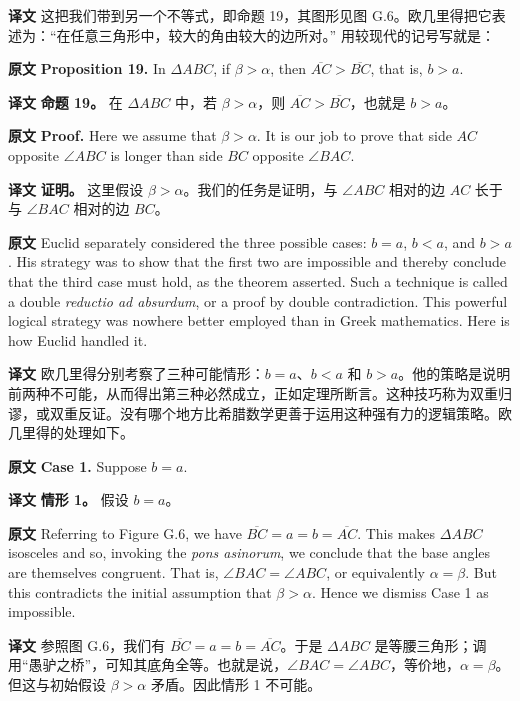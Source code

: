 \documentclass[UTF8,zihao=-4]{ctexart}
\begin{document}
\noindent\textbf{译文} 这把我们带到另一个不等式，即命题 19，其图形见图 G.6。欧几里得把它表述为：``在任意三角形中，较大的角由较大的边所对。'' 用较现代的记号写就是：

\noindent\textbf{原文} \textbf{Proposition 19.} In $\Delta ABC$, if $\beta>\alpha$, then $\overline{AC}>\overline{BC}$, that is, $b>a$.

\noindent\textbf{译文} \textbf{命题 19。} 在 $\Delta ABC$ 中，若 $\beta>\alpha$，则 $\overline{AC}>\overline{BC}$，也就是 $b>a$。

\noindent\textbf{原文} \textbf{Proof.} Here we assume that $\beta>\alpha$. It is our job to prove that side $AC$ opposite $\angle ABC$ is longer than side $BC$ opposite $\angle BAC$.

\noindent\textbf{译文} \textbf{证明。} 这里假设 $\beta>\alpha$。我们的任务是证明，与 $\angle ABC$ 相对的边 $AC$ 长于与 $\angle BAC$ 相对的边 $BC$。

\noindent\textbf{原文} Euclid separately considered the three possible cases: $b=a$, $b<a$, and $b>a$. His strategy was to show that the first two are impossible and thereby conclude that the third case must hold, as the theorem asserted. Such a technique is called a double \textit{reductio ad absurdum}, or a proof by double contradiction. This powerful logical strategy was nowhere better employed than in Greek mathematics. Here is how Euclid handled it.

\noindent\textbf{译文} 欧几里得分别考察了三种可能情形：$b=a$、$b<a$ 和 $b>a$。他的策略是说明前两种不可能，从而得出第三种必然成立，正如定理所断言。这种技巧称为双重归谬，或双重反证。没有哪个地方比希腊数学更善于运用这种强有力的逻辑策略。欧几里得的处理如下。

\noindent\textbf{原文} \textbf{Case 1.} Suppose $b=a$.

\noindent\textbf{译文} \textbf{情形 1。} 假设 $b=a$。

\noindent\textbf{原文} Referring to Figure G.6, we have $\overline{BC}=a=b=\overline{AC}$. This makes $\Delta ABC$ isosceles and so, invoking the \textit{pons asinorum}, we conclude that the base angles are themselves congruent. That is, $\angle BAC=\angle ABC$, or equivalently $\alpha=\beta$. But this contradicts the initial assumption that $\beta>\alpha$. Hence we dismiss Case 1 as impossible.

\noindent\textbf{译文} 参照图 G.6，我们有 $\overline{BC}=a=b=\overline{AC}$。于是 $\Delta ABC$ 是等腰三角形；调用``愚驴之桥''，可知其底角全等。也就是说，$\angle BAC=\angle ABC$，等价地，$\alpha=\beta$。但这与初始假设 $\beta>\alpha$ 矛盾。因此情形 1 不可能。
\end{document}
